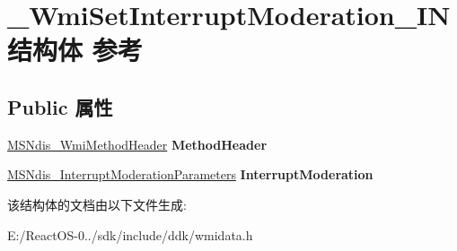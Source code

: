 \hypertarget{struct___wmi_set_interrupt_moderation___i_n}{}\section{\+\_\+\+Wmi\+Set\+Interrupt\+Moderation\+\_\+\+I\+N结构体 参考}
\label{struct___wmi_set_interrupt_moderation___i_n}
\subsection*{Public 属性}
\begin{DoxyCompactItemize}
\item 
\mbox{\label{struct___wmi_set_interrupt_moderation___i_n_a8e4b9c64003bd66efe1fad7cc0609f75}} 
\hyperlink{struct___m_s_ndis___wmi_method_header}{M\+S\+Ndis\+\_\+\+Wmi\+Method\+Header} {\bfseries Method\+Header}
\item 
\mbox{\label{struct___wmi_set_interrupt_moderation___i_n_a679e788884caccb546bcb7889fd11a5e}} 
\hyperlink{struct___m_s_ndis___interrupt_moderation_parameters}{M\+S\+Ndis\+\_\+\+Interrupt\+Moderation\+Parameters} {\bfseries Interrupt\+Moderation}
\end{DoxyCompactItemize}


该结构体的文档由以下文件生成\+:\begin{DoxyCompactItemize}
\item 
E\+:/\+React\+O\+S-\/0../sdk/include/ddk/wmidata.\+h\end{DoxyCompactItemize}
